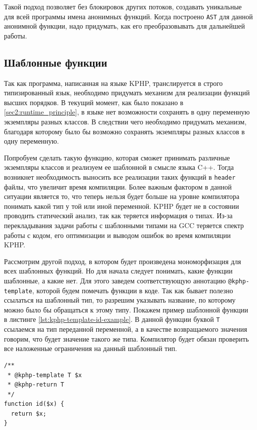 Такой подход позволяет без блокировок других потоков, создавать уникальные для всей программы имена анонимных функций.
Когда построено \verb|AST| для данной анонимной функции, надо придумать, как его преобразовывать для дальнейшей работы.

\subsection{Шаблонные функции}
\label{sec:template_functions}
Так как программа, написанная на языке KPHP, транслируется в строго типизированный язык, необходимо придумать механизм для реализации функций высших порядков.
В текущий момент, как было показано в \ref{sec2:runtime_principle}, в языке нет возможности сохранять в одну переменную экземпляры разных классов.
В следствии чего необходимо придумать механизм, благодаря которому было бы возможно сохранять экземпляры разных классов в одну переменную.

Попробуем сделать такую функцию, которая сможет принимать различные экземпляры классов и реализуем ее шаблонной в смысле языка C++.
Тогда возникнет необходимость выносить все реализации таких функций в \verb|header| файлы, что увеличит время компиляции.
Более важным фактором в данной ситуации является то, что теперь нельзя будет больше на уровне компилятора понимать какой тип у той или иной переменной.
KPHP будет не в состоянии проводить статический анализ, так как теряется информация о типах.
Из-за перекладывания задачи работы с шаблонными типами на GCC \cite{gcc} теряется спектр работы с кодом, его оптимизации и выводом ошибок во время компиляции KPHP.

Рассмотрим другой подход, в котором будет произведена мономорфизация для всех шаблонных функций.
Но для начала следует понимать, какие функции шаблонные, а какие нет.
Для этого заведем соответствующую аннотацию \verb|@kphp-template|, которой будем помечать функции в коде.
Так как бывает полезно ссылаться на шаблонный тип, то разрешим указывать название, по которому можно было бы обращаться к этому типу.
Покажем пример шаблонной функции в листинге \ref{lst:kphp-template-id-example}.
В данной функции буквой \verb|T| ссылаемся на тип переданной переменной,  а в качестве возвращаемого значения говорим, что будет значение такого же типа.
Компилятор будет обязан проверить все наложенные ограничения на данный шаблонный тип.
\begin{lstlisting}[caption={Пример функции id, с применением шаблонов},label={lst:kphp-template-id-example}]
/**
 * @kphp-template T $x
 * @kphp-return T
 */
function id($x) {
  return $x;
}
\end{lstlisting}

